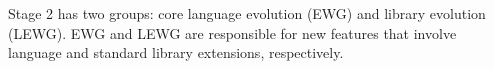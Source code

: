 

Stage 2 has two groups: core language evolution (EWG) and library evolution (LEWG). EWG and LEWG are responsible for new features that involve language and standard library extensions, respectively.